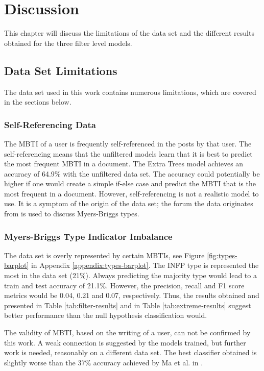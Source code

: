 \section{Discussion} \label{sec:discussion}

This chapter will discuss the limitations of the data set and the different results obtained for the three filter level models. 

\subsection{Data Set Limitations}

The data set used in this work contains numerous limitations, which are covered in the sections below.

\subsubsection{Self-Referencing Data}
The MBTI of a user is frequently self-referenced in the posts by that user. 
The self-referencing means that the unfiltered models learn that it is best to predict the most frequent MBTI in a document.
The Extra Trees model achieves an accuracy of 64.9\% with the unfiltered data set.
The accuracy could potentially be higher if one would create a simple if-else case and predict the MBTI that is the most frequent in a document.
However, self-referencing is not a realistic model to use.
It is a symptom of the origin of the data set; the forum the data originates from is used to discuss Myers-Briggs types.

\subsubsection{Myers-Briggs Type Indicator Imbalance}
The data set is overly represented by certain MBTIs, see Figure \ref{fig:types-barplot} in Appendix \ref{appendix:types-barplot}.
The INFP type is represented the most in the data set (21\%).
Always predicting the majority type would lead to a train and test accuracy of 21.1\%.
However, the precision, recall and F1 score metrics would be 0.04, 0.21 and 0.07, respectively.
Thus, the results obtained and presented in Table \ref{tab:filter-results} and in Table \ref{tab:extreme-results} suggest better performance than the null hypothesis classification would.

The validity of MBTI, based on the writing of a user, can not be confirmed by this work.
A weak connection is suggested by the models trained, but further work is needed, reasonably on a different data set.
The best classifier obtained is slightly worse than the 37\% accuracy achieved by Ma et al. in \cite{maneural}.

